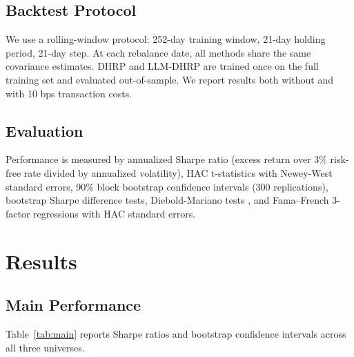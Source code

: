 \documentclass[11pt]{article}
\begin{document}
\subsection{Backtest Protocol}

We use a rolling-window protocol: 252-day training window, 21-day holding period, 21-day step. At each rebalance date, all methods share the same covariance estimates. DHRP and LLM-DHRP are trained once on the full training set and evaluated out-of-sample. We report results both without and with 10 bps transaction costs.

\subsection{Evaluation}

Performance is measured by annualized Sharpe ratio (excess return over 3\% risk-free rate divided by annualized volatility), HAC t-statistics with Newey-West standard errors, 90\% block bootstrap confidence intervals (300 replications), bootstrap Sharpe difference tests, Diebold-Mariano tests \citep{Diebold1995}, and Fama--French 3-factor regressions with HAC standard errors.

\section{Results}

\subsection{Main Performance}

Table~\ref{tab:main} reports Sharpe ratios and bootstrap confidence intervals across all three universes.
\end{document}
